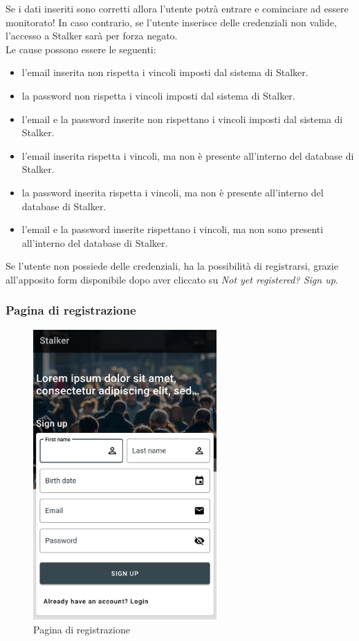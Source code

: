 \documentclass[../manuale-utente.tex]{subfiles}
\begin{document}
Se i dati inseriti sono corretti allora l'utente potrà entrare e cominciare ad essere monitorato!
In caso contrario, se l'utente inserisce delle credenziali non valide, l'accesso a Stalker sarà per forza negato.\\
Le cause possono essere le seguenti:
\begin{itemize}
    \item l'email inserita non rispetta i vincoli imposti dal sistema di Stalker.
    \item la password non rispetta i vincoli imposti dal sistema di Stalker.
    \item l'email e la password inserite non rispettano i vincoli imposti dal sistema di Stalker.
    \item l'email inserita rispetta i vincoli, ma non è presente all'interno del database di Stalker.
    \item la password inserita rispetta i vincoli, ma non è presente all'interno del database di Stalker.
    \item l'email e la password inserite rispettano i vincoli, ma non sono presenti all'interno del database di Stalker.
\end{itemize}

Se l'utente non possiede delle credenziali, ha la possibilità di registrarsi, grazie all'apposito form disponibile dopo aver cliccato su \emph{Not yet registered? Sign up}.
\newpage
\subsubsection{Pagina di registrazione}%
\label{sub:pagina-di-registrazione}

\begin{figure}[H]
    \centering
    \includegraphics[width=70mm]{img/mobile-app/pagina-di-registrazione.jpg}
    \caption{Pagina di registrazione}%
    \label{fig:mobile-app-pagina-di-registrazione}
\end{figure}
\end{document}
